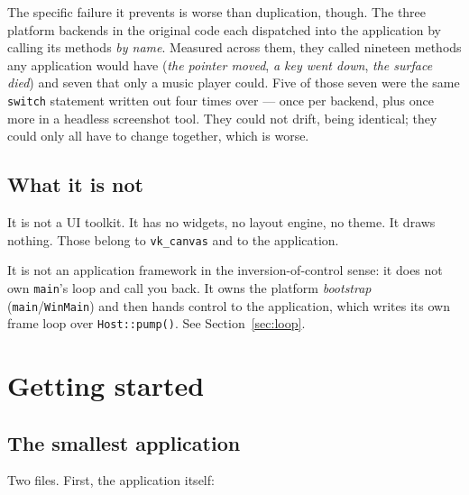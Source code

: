 \documentclass[11pt,a4paper]{article}
\begin{document}
The specific failure it prevents is worse than duplication, though. The three
platform backends in the original code each dispatched into the application by
calling its methods \emph{by name}. Measured across them, they called nineteen
methods any application would have (\emph{the pointer moved}, \emph{a key went
down}, \emph{the surface died}) and seven that only a music player could. Five
of those seven were the same \texttt{switch} statement written out four times
over --- once per backend, plus once more in a headless screenshot tool. They
could not drift, being identical; they could only all have to change together,
which is worse.

\subsection{What it is not}

It is not a UI toolkit. It has no widgets, no layout engine, no theme. It draws
nothing. Those belong to \texttt{vk\_canvas} and to the application.

It is not an application framework in the inversion-of-control sense: it does
not own \texttt{main}'s loop and call you back. It owns the platform
\emph{bootstrap} (\texttt{main}/\texttt{WinMain}) and then hands control to the
application, which writes its own frame loop over \texttt{Host::pump()}. See
Section~\ref{sec:loop}.

\section{Getting started}

\subsection{The smallest application}

Two files. First, the application itself:
\end{document}
